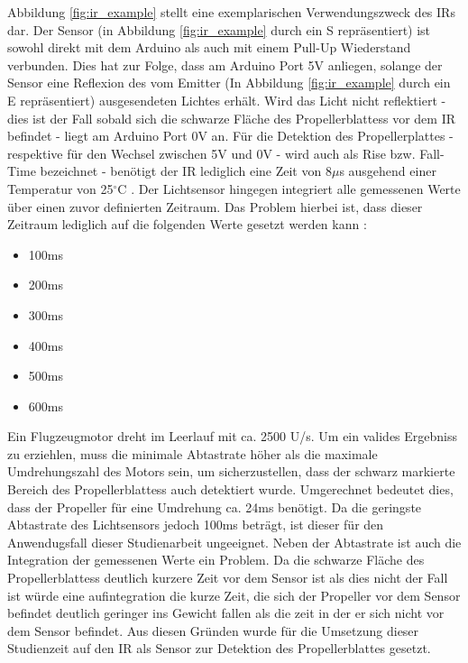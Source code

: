 Abbildung \ref{fig:ir_example} stellt eine exemplarischen Verwendungszweck des \ac{IR}s dar. 
Der Sensor (in Abbildung \ref{fig:ir_example} durch ein S repräsentiert) ist sowohl direkt mit dem Arduino als auch mit einem Pull-Up Wiederstand verbunden.
Dies hat zur Folge, dass am Arduino Port 5V anliegen, solange der Sensor eine Reflexion des vom Emitter (In Abbildung \ref{fig:ir_example} durch ein E repräsentiert) ausgesendeten Lichtes erhält.
Wird das Licht nicht reflektiert - dies ist der Fall sobald sich die schwarze Fläche des Propellerblattess vor dem \ac{IR} befindet - liegt am Arduino Port 0V an.
Für die Detektion des Propellerplattes - respektive für den Wechsel zwischen 5V und 0V - wird auch als Rise bzw. Fall-Time bezeichnet - benötigt der \ac{IR} lediglich eine Zeit von 8$\mu$s ausgehend einer Temperatur von 25$^\circ$C \cite[S.2]{ir_datasheet}.
Der Lichtsensor hingegen integriert alle gemessenen Werte über einen zuvor definierten Zeitraum. Das Problem hierbei ist, dass dieser Zeitraum lediglich auf die folgenden Werte gesetzt werden kann \cite[S.13]{tsl2591_datasheet}:
\begin{itemize}
	\item 100ms
	\item 200ms
	\item 300ms
	\item 400ms
	\item 500ms
	\item 600ms
\end{itemize}
Ein Flugzeugmotor dreht im Leerlauf mit ca. 2500 U/s. Um ein valides Ergebniss zu erziehlen, muss die minimale Abtastrate höher als die maximale Umdrehungszahl des Motors sein, um sicherzustellen, dass der schwarz markierte Bereich des Propellerblattess auch detektiert wurde.
Umgerechnet bedeutet dies, dass der Propeller für eine Umdrehung ca. 24ms benötigt.
Da die geringste Abtastrate des Lichtsensors jedoch 100ms beträgt, ist dieser für den Anwendugsfall dieser Studienarbeit ungeeignet.
Neben der Abtastrate ist auch die Integration der gemessenen Werte ein Problem. 
Da die schwarze Fläche des Propellerblattess deutlich kurzere Zeit vor dem Sensor ist als dies nicht der Fall ist würde eine aufintegration die kurze Zeit, die sich der Propeller vor dem Sensor befindet deutlich geringer ins Gewicht fallen als die zeit in der er sich nicht vor dem Sensor befindet.
Aus diesen Gründen wurde für die Umsetzung dieser Studienzeit auf den \ac{IR} als Sensor zur Detektion des Propellerblattes gesetzt.



